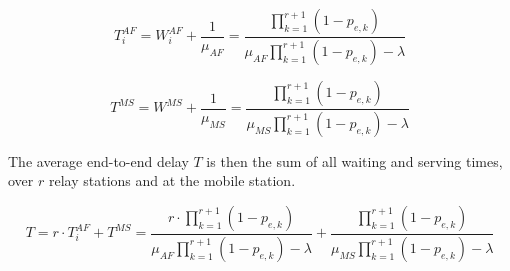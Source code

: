 \begin{equation}
  T_i^{AF} = W_i^{AF} + \dfrac{1}{\mu_{AF}} =
  \dfrac{\prod\limits_{k=1}^{r+1} (1 - p_{e,k})}{\mu_{AF}\prod\limits_{k=1}^{r+1} (1 - p_{e,k}) -\lambda}
  \label{eq:01_7}
\end{equation}

\begin{equation}
  T^{MS} = W^{MS} + \dfrac{1}{\mu_{MS}} =
  \dfrac{\prod\limits_{k=1}^{r+1} (1 - p_{e,k})}{\mu_{MS}\prod\limits_{k=1}^{r+1} (1 - p_{e,k}) -\lambda}
  \label{eq:01_8}
\end{equation}


The average end-to-end delay $T$ is then the sum of all waiting and serving times,
over $r$ relay stations and at the mobile station.


\begin{equation}
  T = r \cdot T_i^{AF} + T^{MS} =
  \dfrac{r \cdot \prod\limits_{k=1}^{r+1} (1 - p_{e,k})}{\mu_{AF}\prod\limits_{k=1}^{r+1} (1 - p_{e,k}) -\lambda}
  + \dfrac{\prod\limits_{k=1}^{r+1} (1 - p_{e,k})}{\mu_{MS}\prod\limits_{k=1}^{r+1} (1 - p_{e,k}) -\lambda}
\end{equation}
